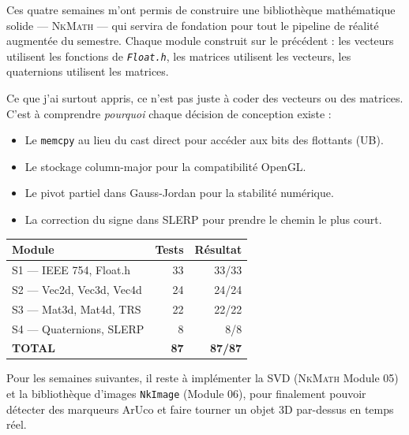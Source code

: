 \documentclass[12pt,a4paper]{report}
\newcommand{\code}[1]{\texttt{\textcolor{myblue}{#1}}}
\newcommand{\file}[1]{\texttt{\textit{#1}}}
\newcommand{\nkmath}{\textsc{NkMath}}
\begin{document}
Ces quatre semaines m'ont permis de construire une bibliothèque mathématique solide — \nkmath{} — qui servira de fondation pour tout le pipeline de réalité augmentée du semestre. Chaque module construit sur le précédent : les vecteurs utilisent les fonctions de \file{Float.h}, les matrices utilisent les vecteurs, les quaternions utilisent les matrices.

Ce que j'ai surtout appris, ce n'est pas juste à coder des vecteurs ou des matrices. C'est à comprendre \textit{pourquoi} chaque décision de conception existe :
\begin{itemize}
    \item Le \code{memcpy} au lieu du cast direct pour accéder aux bits des flottants (UB).
    \item Le stockage column-major pour la compatibilité OpenGL.
    \item Le pivot partiel dans Gauss-Jordan pour la stabilité numérique.
    \item La correction du signe dans SLERP pour prendre le chemin le plus court.
\end{itemize}

\medskip

\begin{infobox}
\begin{center}
\begin{tabular}{lrr}
\toprule
\textbf{Module} & \textbf{Tests} & \textbf{Résultat} \\
\midrule
S1 — IEEE 754, Float.h      & 33 & 33/33 \\
S2 — Vec2d, Vec3d, Vec4d    & 24 & 24/24 \\
S3 — Mat3d, Mat4d, TRS      & 22 & 22/22 \\
S4 — Quaternions, SLERP     & 8  & 8/8   \\
\midrule
\textbf{TOTAL}              & \textbf{87} & \textbf{87/87} \\
\bottomrule
\end{tabular}
\end{center}
\end{infobox}

\medskip

Pour les semaines suivantes, il reste à implémenter la SVD (\nkmath{} Module 05) et la bibliothèque d'images \code{NkImage} (Module 06), pour finalement pouvoir détecter des marqueurs ArUco et faire tourner un objet 3D par-dessus en temps réel.

\appendix
\end{document}
